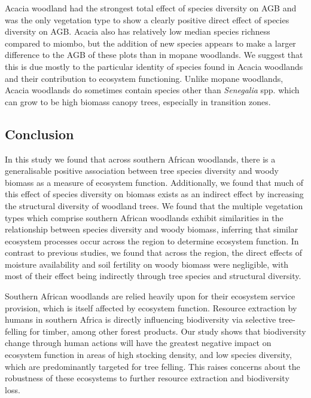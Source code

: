 \documentclass[11pt,a4paper]{article}
\begin{document}
Acacia woodland had the strongest total effect of species diversity on AGB and was the only vegetation type to show a clearly positive direct effect of species diversity on AGB. Acacia also has relatively low median species richness compared to miombo, but the addition of new species appears to make a larger difference to the AGB of these plots than in mopane woodlands. We suggest that this is due mostly to the particular identity of species found in Acacia woodlands and their contribution to ecosystem functioning. Unlike mopane woodlands, Acacia woodlands do sometimes contain species other than \textit{Senegalia} spp. which can grow to be high biomass canopy trees, especially in transition zones. 

\subsection{Conclusion}

In this study we found that across southern African woodlands, there is a generalisable positive association between tree species diversity and woody biomass as a measure of ecosystem function. Additionally, we found that much of this effect of species diversity on biomass exists as an indirect effect by increasing the structural diversity of woodland trees. We found that the multiple vegetation types which comprise southern African woodlands exhibit similarities in the relationship between species diversity and woody biomass, inferring that similar ecosystem processes occur across the region to determine ecosystem function. In contrast to previous studies, we found that across the region, the direct effects of moisture availability and soil fertility on woody biomass were negligible, with most of their effect being indirectly through tree species and structural diversity. 

Southern African woodlands are relied heavily upon for their ecosystem service provision, which is itself affected by ecosystem function. Resource extraction by humans in southern Africa is directly influencing biodiversity via selective tree-felling for timber, among other forest products. Our study shows that biodiversity change through human actions will have the greatest negative impact on ecosystem function in areas of high stocking density, and low species diversity, which are predominantly targeted for tree felling. This raises concerns about the robustness of these ecosystems to further resource extraction and biodiversity loss. 


\end{document}
